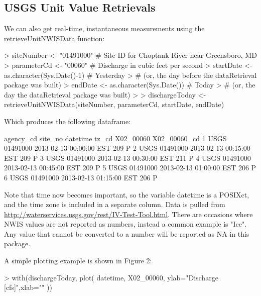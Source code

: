 \documentclass[a4paper,11pt]{article}
\begin{document}
\subsection{USGS Unit Value Retrievals}
We can also get real-time, instantaneous measurements using the retrieveUnitNWISData function:
\begin{Schunk}
\begin{Sinput}
> siteNumber <- "01491000" # Site ID for Choptank River near Greensboro, MD
> parameterCd <- "00060"  # Discharge in cubic feet per second
> startDate <- as.character(Sys.Date()-1) # Yesterday 
>   # (or, the day before the dataRetrieval package was built)
> endDate <- as.character(Sys.Date()) # Today 
>   # (or, the day the dataRetrieval package was built)
> 
> dischargeToday <- retrieveUnitNWISData(siteNumber, parameterCd, 
         startDate, endDate)
\end{Sinput}
\end{Schunk}
Which produces the following dataframe:
\begin{Schunk}
\begin{Soutput}
  agency_cd  site_no            datetime tz_cd X02_00060 X02_00060_cd
1      USGS 01491000 2013-02-13 00:00:00   EST       209            P
2      USGS 01491000 2013-02-13 00:15:00   EST       209            P
3      USGS 01491000 2013-02-13 00:30:00   EST       211            P
4      USGS 01491000 2013-02-13 00:45:00   EST       209            P
5      USGS 01491000 2013-02-13 01:00:00   EST       206            P
6      USGS 01491000 2013-02-13 01:15:00   EST       206            P
\end{Soutput}
\end{Schunk}

Note that time now becomes important, so the variable datetime is a POSIXct, and the time zone is included in a separate column. Data is pulled from \url{http://waterservices.usgs.gov/rest/IV-Test-Tool.html}. There are occasions where NWIS values are not reported as numbers, instead a common example is "Ice".  Any value that cannot be converted to a number will be reported as NA in this package.

A simple plotting example is shown in Figure 2:
\begin{Schunk}
\begin{Sinput}
> with(dischargeToday, plot(
   datetime, X02_00060,
   ylab="Discharge [cfs]",xlab=""
   ))
\end{Sinput}
\end{Schunk}
\newpage
\end{document}
